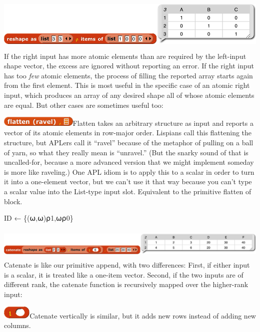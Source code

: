 \includegraphics[width=6.575in,height=1.04167in]{media/image1272.png}If
the right input has more atomic elements than are required by the
left-input shape vector, the excess are ignored without reporting an
error. If the right input has too \emph{few} atomic elements, the
process of filling the reported array starts again from the first
element. This is most useful in the specific case of an atomic right
input, which produces an array of any desired shape all of whose atomic
elements are equal. But other cases are sometimes useful too:

\includegraphics[width=1.43333in,height=0.18333in]{media/image1275.png}Flatten
takes an arbitrary structure as input and reports a vector of its atomic
elements in row-major order. Lispians call this flattening the
structure, but APLers call it ``ravel'' because of the metaphor of
pulling on a ball of yarn, so what they really mean is ``unravel.'' (But
the snarky sound of that is uncalled-for, because a more advanced
version that we might implement someday is more like raveling.) One APL
idiom is to apply this to a scalar in order to turn it into a
one-element vector, but we can't use it that way because you can't type
a scalar value into the List-type input slot. Equivalent to the
primitive flatten of block.

ID ← \{(⍵,⍵)⍴1,⍵⍴0\}

\includegraphics[width=7.20417in,height=0.58333in]{media/image1280.png}Catenate
is like our primitive append, with two differences: First, if either
input is a scalar, it is treated like a one-item vector. Second, if the
two inputs are of different rank, the catenate function is recursively
mapped over the higher-rank input:

\includegraphics[width=0.53333in,height=0.25in]{media/image1281.png}Catenate
vertically is similar, but it adds new rows instead of adding new
columns.


